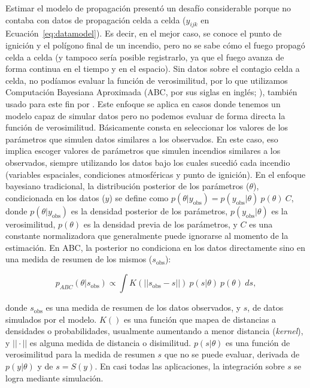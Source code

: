 Estimar el modelo de propagación presentó un desafío considerable porque no contaba con datos de propagación celda a celda ($y_{ijk}$ en Ecuación~\ref{eq:datamodel}). Es decir, en el mejor caso, se conoce el punto de ignición y el polígono final de un incendio, pero no se sabe cómo el fuego propagó celda a celda (y tampoco sería posible registrarlo, ya que el fuego avanza de forma continua en el tiempo y en el espacio). Sin datos sobre el contagio celda a celda, no podíamos evaluar la función de verosimilitud, por lo que utilizamos Computación Bayesiana Aproximada (ABC, por sus siglas en inglés; \citealt{sisson2018handbook,beaumont2010approximate}), también usado para este fin por \citet{morales_stochastic_2015}. Este enfoque se aplica en casos donde tenemos un modelo capaz de simular datos pero no podemos evaluar de forma directa la función de verosimilitud. Básicamente consta en seleccionar los valores de los parámetros que simulen datos similares a los observados. En este caso, eso implica escoger valores de parámetros que simulen incendios similares a los observados, siempre utilizando los datos bajo los cuales sucedió cada incendio (variables espaciales, condiciones atmosféricas y punto de ignición). En el enfoque bayesiano tradicional, la distribución posterior de los parámetros ($\theta$), condicionada en los datos ($y$) se define como $p(\theta | y_{\text{obs}}) = p(y_{\text{obs}} | \theta) \ p(\theta) \ C$, donde $p(\theta | y_{\text{obs}})$ es la densidad posterior de los parámetros, $p(y_{\text{obs}} | \theta)$ es la verosimilitud, $p(\theta)$ es la densidad previa de los parámetros, y $C$ es una constante normalizadora que generalmente puede ignorarse al momento de la estimación. En ABC, la posterior no condiciona en los datos directamente sino en una medida de resumen de los mismos ($s_{\text{obs}}$):

$$p_{ABC}(\theta | s_{\text{obs}}) \propto \int K(||s_{\text{obs}} - s||) \ p(s | \theta) \ p(\theta) \ ds,$$

\noindent donde $s_{\text{obs}}$ es una medida de resumen de los datos observados, y $s$, de datos simulados por el modelo. $K()$ es una función que mapea de distancias a densidades o probabilidades, usualmente aumentando a menor distancia (\textit{kernel}), y $||\cdot||$ es alguna medida de distancia o disimilitud. $p(s | \theta)$ es una función de verosimilitud para la medida de resumen $s$ que no se puede evaluar, derivada de $p(y | \theta)$ y de $s = S(y)$. En casi todas las aplicaciones, la integración sobre $s$ se logra mediante simulación. 

